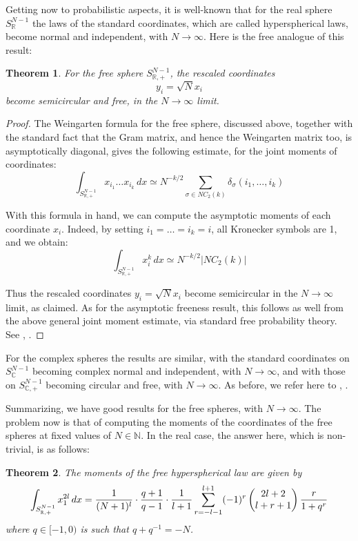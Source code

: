 \documentclass[12pt]{amsbook}
\newtheorem{theorem}{Theorem}[chapter]
\begin{document}
Getting now to probabilistic aspects, it is well-known that for the real sphere $S^{N-1}_\mathbb R$ the laws of the standard coordinates, which are called hyperspherical laws, become normal and independent, with $N\to\infty$. Here is the free analogue of this result:

\begin{theorem}
For the free sphere $S^{N-1}_{\mathbb R,+}$, the rescaled coordinates 
$$y_i=\sqrt{N}x_i$$
become semicircular and free, in the $N\to\infty$ limit.
\end{theorem}

\begin{proof}
The Weingarten formula for the free sphere, discussed above, together with the standard fact that the Gram matrix, and hence the Weingarten matrix too, is asymptotically diagonal, gives the following estimate, for the joint moments of coordinates:
$$\int_{S^{N-1}_{\mathbb R,+}}x_{i_1}\ldots x_{i_k}\,dx\simeq N^{-k/2}\sum_{\sigma\in NC_2(k)}\delta_\sigma(i_1,\ldots,i_k)$$

With this formula in hand, we can compute the asymptotic moments of each coordinate $x_i$. Indeed, by setting $i_1=\ldots=i_k=i$, all Kronecker symbols are 1, and we obtain:
$$\int_{S^{N-1}_{\mathbb R,+}}x_i^k\,dx\simeq N^{-k/2}|NC_2(k)|$$

Thus the rescaled coordinates $y_i=\sqrt{N}x_i$ become semicircular in the $N\to\infty$ limit, as claimed. As for the asymptotic freeness result, this follows as well from the above general joint moment estimate, via standard free probability theory. See \cite{bco}, \cite{bgo}.
\end{proof}

For the complex spheres the results are similar, with the standard coordinates on $S^{N-1}_\mathbb C$ becoming complex normal and independent, with $N\to\infty$, and with those on $S^{N-1}_{\mathbb C,+}$ becoming circular and free, with $N\to\infty$. As before, we refer here to \cite{bco}, \cite{bgo}.

\bigskip

Summarizing, we have good results for the free spheres, with $N\to\infty$. The problem now is that of computing the moments of the coordinates of the free spheres at fixed values of $N\in\mathbb N$. In the real case, the answer here, which is non-trivial, is as follows:


\begin{theorem}
The moments of the free hyperspherical law are given by
$$\int_{S^{N-1}_{\mathbb R,+}}x_1^{2l}\,dx=\frac{1}{(N+1)^l}\cdot\frac{q+1}{q-1}\cdot\frac{1}{l+1}\sum_{r=-l-1}^{l+1}(-1)^r\begin{pmatrix}2l+2\cr l+r+1\end{pmatrix}\frac{r}{1+q^r}$$
where $q\in [-1,0)$ is such that $q+q^{-1}=-N$.
\end{theorem}
\end{document}

